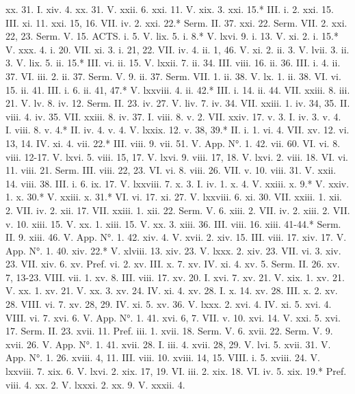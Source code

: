 xx. 31.	I. xiv. 4.
xx. 31.	V. xxii. 6.
xxi. 11.	V. xix. 3.
xxi. 15.*	III. i. 2.
xxi. 15.	III. xi. 11.
xxi. 15, 16.	VII. iv. 2.
xxi. 22.*	Serm. II. 37.
xxi. 22.	Serm. VII. 2.
xxi. 22, 23.	Serm. V. 15.
ACTS.
i. 5.	V. lix. 5.
i. 8.*	V. lxvi. 9.
i. 13.	V. xi. 2.
i. 15.*	V. xxx. 4.
i. 20.	VII. xi. 3.
i. 21, 22.	VII. iv. 4.
ii. 1, 46.	V. xi. 2.
ii. 3.	V. lvii. 3.
ii. 3.	V. lix. 5.
ii. 15.*	III. vi.
ii. 15.	V. lxxii. 7.
ii. 34.	III. viii. 16.
ii. 36.	III. i. 4.
ii. 37.	VI. iii. 2.
ii. 37.	Serm. V. 9.
ii. 37.	Serm. VII. 1.
ii. 38.	V. lx. 1.
ii. 38.	VI. vi. 15.
ii. 41.	III. i. 6.
ii. 41, 47.*	V. lxxviii. 4.
ii. 42.*	III. i. 14.
ii. 44.	VII. xxiii. 8.
iii. 21.	V. lv. 8.
iv. 12.	Serm. II. 23.
iv. 27.	V. liv. 7.
iv. 34.	VII. xxiii. 1.
iv. 34, 35.	II. viii. 4.
iv. 35.	VII. xxiii. 8.
iv. 37.	I. viii. 8.
v. 2.	VII. xxiv. 17.
v. 3.	I. iv. 3.
v. 4.	I. viii. 8.
v. 4.*	II. iv. 4.
v. 4.	V. lxxix. 12.
v. 38, 39.*	II. i. 1.
vi. 4.	VII. xv. 12.
vi. 13, 14.	IV. xi. 4.
vii. 22.*	III. viii. 9.
vii. 51.	V. App. N°. 1. 42.
vii. 60.	VI. vi. 8.
viii. 12-17.	V. lxvi. 5.
viii. 15, 17.	V. lxvi. 9.
viii. 17, 18.	V. lxvi. 2.
viii. 18.	VI. vi. 11.
viii. 21.	Serm. III.
viii. 22, 23.	VI. vi. 8.
viii. 26.	VII. v. 10.
viii. 31.	V. xxii. 14.
viii. 38.	III. i. 6.
ix. 17.	V. lxxviii. 7.
x. 3.	I. iv. 1.
x. 4.	V. xxiii.
x. 9.*	V. xxiv. 1.
x. 30.*	V. xxiii.
x. 31.*	VI. vi. 17.
xi. 27.	V. lxxviii. 6.
xi. 30.	VII. xxiii. 1.
xii. 2.	VII. iv. 2.
xii. 17.	VII. xxiii. 1.
xii. 22.	Serm. V. 6.
xiii. 2.	VII. iv. 2.
xiii. 2.	VII. v. 10.
xiii. 15.	V. xx. 1.
xiii. 15.	V. xx. 3.
xiii. 36.	III. viii. 16.
xiii. 41-44.*	Serm. II. 9.
xiii. 46.	V. App. N°. 1. 42.
xiv. 4.	V. xvii. 2.
xiv. 15.	III. viii. 17.
xiv. 17.	V. App. N°. 1. 40.
xiv. 22.*	V. xlviii. 13.
xiv. 23.	V. lxxx. 2.
xiv. 23.	VII. vi. 3.
xiv. 23.	VII. xiv. 6.
xv.	Pref. vi. 2.
xv.	III. x. 7.
xv.	IV. xi. 4.
xv. 5.	Serm. II. 26.
xv. 7, 13-23.	VIII. vii. 1.
xv. 8.	III. viii. 17.
xv. 20.	I. xvi. 7.
xv. 21.	V. xix. 1.
xv. 21.	V. xx. 1.
xv. 21.	V. xx. 3.
xv. 24.	IV. xi. 4.
xv. 28.	I. x. 14.
xv. 28.	III. x. 2.
xv. 28.	VIII. vi. 7.
xv. 28, 29.	IV. xi. 5.
xv. 36.	V. lxxx. 2.
xvi. 4.	IV. xi. 5.
xvi. 4.	VIII. vi. 7.
xvi. 6.	V. App. N°. 1. 41.
xvi. 6, 7.	VII. v. 10.
xvi. 14.	V. xxi. 5.
xvi. 17.	Serm. II. 23.
xvii. 11.	Pref. iii. 1.
xvii. 18.	Serm. V. 6.
xvii. 22.	Serm. V. 9.
xvii. 26.	V. App. N°. 1. 41.
xvii. 28.	I. iii. 4.
xvii. 28, 29.	V. lvi. 5.
xvii. 31.	V. App. N°. 1. 26.
xviii. 4, 11.	III. viii. 10.
xviii. 14, 15.	VIII. i. 5.
xviii. 24.	V. lxxviii. 7.
xix. 6.	V. lxvi. 2.
xix. 17, 19.	VI. iii. 2.
xix. 18.	VI. iv. 5.
xix. 19.*	Pref. viii. 4.
xx. 2.	V. lxxxi. 2.
xx. 9.	V. xxxii. 4.
